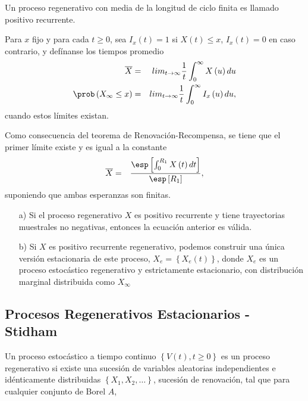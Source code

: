 \begin{Note}
Un proceso regenerativo con media de la longitud de ciclo finita es llamado positivo recurrente.
\end{Note}


\begin{Def}
Para $x$ fijo y para cada $t\geq0$, sea $I_{x}\left(t\right)=1$ si $X\left(t\right)\leq x$,  $I_{x}\left(t\right)=0$ en caso contrario, y def\'inanse los tiempos promedio
\begin{eqnarray*}
\overline{X}&=&lim_{t\rightarrow\infty}\frac{1}{t}\int_{0}^{\infty}X\left(u\right)du\\
\prob\left(X_{\infty}\leq x\right)&=&lim_{t\rightarrow\infty}\frac{1}{t}\int_{0}^{\infty}I_{x}\left(u\right)du,
\end{eqnarray*}
cuando estos l\'imites existan.
\end{Def}

Como consecuencia del teorema de Renovaci\'on-Recompensa, se tiene que el primer l\'imite  existe y es igual a la constante
\begin{eqnarray*}
\overline{X}&=&\frac{\esp\left[\int_{0}^{R_{1}}X\left(t\right)dt\right]}{\esp\left[R_{1}\right]},
\end{eqnarray*}
suponiendo que ambas esperanzas son finitas.

\begin{Note}
\begin{itemize}
\item[a)] Si el proceso regenerativo $X$ es positivo recurrente y tiene trayectorias muestrales no negativas, entonces la ecuaci\'on anterior es v\'alida.
\item[b)] Si $X$ es positivo recurrente regenerativo, podemos construir una \'unica versi\'on estacionaria de este proceso, $X_{e}=\left\{X_{e}\left(t\right)\right\}$, donde $X_{e}$ es un proceso estoc\'astico regenerativo y estrictamente estacionario, con distribuci\'on marginal distribuida como $X_{\infty}$
\end{itemize}
\end{Note}
\subsection{Procesos Regenerativos Estacionarios - Stidham \cite{Stidham}}


Un proceso estoc\'astico a tiempo continuo $\left\{V\left(t\right),t\geq0\right\}$ es un proceso regenerativo si existe una sucesi\'on de variables aleatorias independientes e id\'enticamente distribuidas $\left\{X_{1},X_{2},\ldots\right\}$, sucesi\'on de renovaci\'on, tal que para cualquier conjunto de Borel $A$, 

